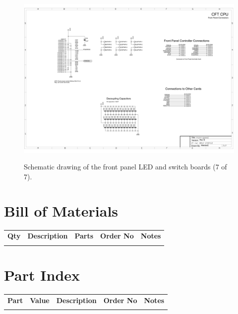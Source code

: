 \documentclass[11pt,a4paper,twocolumns]{article}
\begin{document}
\begin{figure}
\centering
\includegraphics[width=0.95\textheight,angle=90]{figs/front-panel-7.jpg}\\
\caption{\label{fig-schematic-front-panel-7}Schematic drawing of the front panel LED and switch boards (7 of 7).}
\end{figure}

%
%

{
  \onecolumn
  \section{Bill of Materials}
  \footnotesize
  \begin{longtable}{r@{$\times\;$}p{}p{}ll}
    \noalign{\smallskip}\hline\noalign{\smallskip}
    {\bf Qty} & {\bf Description} & {\bf Parts} & {\bf Order No} & {\bf Notes}\\
    \noalign{\smallskip}\hline\noalign{\smallskip}
    \endhead
    \noalign{\smallskip}\hline\noalign{\smallskip}
    \endlastfoot
    
  \end{longtable}
}

%
%

{
  \section{Part Index}
  \footnotesize
  \begin{longtable}{lllll}
    \noalign{\smallskip}\hline\noalign{\smallskip}
    {\bf Part} & {\bf Value} & {\bf Description} & {\bf Order No} & {\bf Notes}\\
    \noalign{\smallskip}\hline\noalign{\smallskip}
    \endhead
    \noalign{\smallskip}\hline\noalign{\smallskip}
    \endlastfoot
    
  \end{longtable}
  \twocolumn
}
\end{document}
